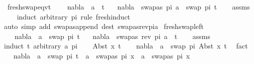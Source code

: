 \begin{isabellebody}
\isanewline
{}\isamarkupfalse%
\ fresh{\isacharunderscore}{\kern0pt}swap{\isacharunderscore}{\kern0pt}eqvt{\isacharcolon}{\kern0pt}\ \isanewline
\ \ \ {\isachardoublequoteopen}nabla\ {\isasymturnstile}\ a\ {\isasymsharp}\ t{\isachardoublequoteclose}\isanewline
\ \ \ {\isachardoublequoteopen}nabla\ {\isasymturnstile}\ swapas\ pi\ a\ {\isasymsharp}\ swap\ pi\ t{\isachardoublequoteclose}\isanewline
%
\isadelimproof
\ \ %
\endisadelimproof
%
\isatagproof
{}\isamarkupfalse%
\ assms\isanewline
\ \ \isamarkupfalse%
\ {\isacharparenleft}{\kern0pt}induct\ arbitrary{\isacharcolon}{\kern0pt}\ pi\ rule{\isacharcolon}{\kern0pt}\ fresh{\isachardot}{\kern0pt}induct{\isacharparenright}{\kern0pt}\isanewline
{\isacharparenleft}{\kern0pt}auto\ simp\ add{\isacharcolon}{\kern0pt}\ swapas{\isacharunderscore}{\kern0pt}append\ dest{\isacharcolon}{\kern0pt}\ swapas{\isacharunderscore}{\kern0pt}rev{\isacharunderscore}{\kern0pt}pi{\isacharunderscore}{\kern0pt}a{\isacharparenright}{\kern0pt}%
\endisatagproof
{\isafoldproof}%
%
\isadelimproof
\isanewline
%
\endisadelimproof
\isanewline
\isanewline
{}\isamarkupfalse%
\ fresh{\isacharunderscore}{\kern0pt}swap{\isacharunderscore}{\kern0pt}left{\isacharcolon}{\kern0pt}\ \isanewline
\ \ \ {\isachardoublequoteopen}nabla\ {\isasymturnstile}\ a\ {\isasymsharp}\ swap\ pi\ t{\isachardoublequoteclose}\isanewline
\ \ \ {\isachardoublequoteopen}nabla\ {\isasymturnstile}\ swapas\ {\isacharparenleft}{\kern0pt}rev\ pi{\isacharparenright}{\kern0pt}\ a\ {\isasymsharp}\ t{\isachardoublequoteclose}\isanewline
%
\isadelimproof
\ \ %
\endisadelimproof
%
\isatagproof
{}\isamarkupfalse%
\ assms\isanewline
{}\isamarkupfalse%
{\isacharparenleft}{\kern0pt}induct\ t\ arbitrary{\isacharcolon}{\kern0pt}\ a\ pi{\isacharparenright}{\kern0pt}\isanewline
\ \ \isamarkupfalse%
\ {\isacharparenleft}{\kern0pt}Abst\ x{}\ t{\isacharparenright}{\kern0pt}\isanewline
\ \ \isamarkupfalse%
\ {\isachardoublequoteopen}nabla\ {\isasymturnstile}\ a\ {\isasymsharp}\ swap\ pi\ {\isacharparenleft}{\kern0pt}Abst\ x{}\ t{\isacharparenright}{\kern0pt}{\isachardoublequoteclose}\ \isamarkupfalse%
\ fact\isanewline
\ \ \isamarkupfalse%
\ \isamarkupfalse%
\ {\isachardoublequoteopen}{\isacharparenleft}{\kern0pt}nabla\ {\isasymturnstile}\ a\ {\isasymsharp}\ swap\ pi\ t\ {\isasymand}\ a\ {\isasymnoteq}\ swapas\ pi\ x{}{\isacharparenright}{\kern0pt}\ {\isasymor}\ {\isacharparenleft}{\kern0pt}a\ {\isacharequal}{\kern0pt}\ swapas\ pi\ x{}{\isacharparenright}{\kern0pt}{\isachardoublequoteclose}\isanewline

\end{isabellebody}
